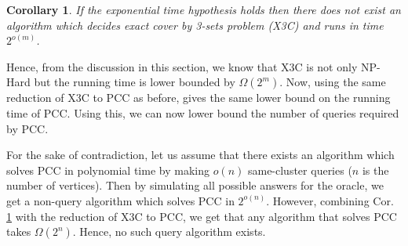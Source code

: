 \documentclass[12pt]{article}
\newtheorem{corollary}[theorem]{Corollary}
\begin{document}
\begin{corollary}
\label{cor:X3CLowerBound}
If the exponential time hypothesis holds then there does not exist an algorithm which decides exact cover by 3-sets problem (X3C) and runs in time $2^{o(m)}$.
\end{corollary}

Hence, from the discussion in this section, we know that X3C is not only NP-Hard but the running time is lower bounded by $\Omega(2^m)$. Now, using the same reduction of X3C to PCC as before, gives the same lower bound on the running time of PCC. Using this, we can now lower bound the number of queries required by PCC.

For the sake of contradiction, let us assume that there exists an algorithm which solves PCC in polynomial time by making $o(n)$ same-cluster queries ($n$ is the number of vertices). Then by simulating all possible answers for the oracle, we get a non-query algorithm which solves PCC in $2^{o(n)}$. However, combining Cor. \ref{cor:X3CLowerBound} with the reduction of X3C to PCC, we get that any algorithm that solves PCC takes $\Omega(2^n)$. Hence, no such query algorithm exists. 

\ifdefined\COMPLETE
\else
\end{document}
